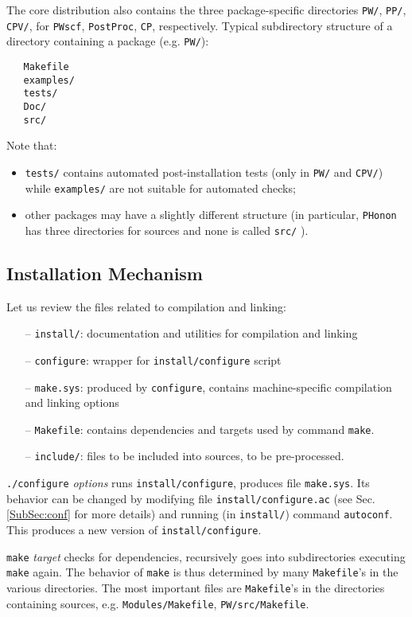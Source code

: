\documentclass[12pt,a4paper]{article}
\def\configure{\texttt{configure}}
\def\autoconf{\texttt{autoconf}}
\def\make.sys{\texttt{make.sys}}
\def\Makefile{\texttt{Makefile}}
\begin{document}
The core distribution also  contains the three package-specific directories
\texttt{PW/}, \texttt{PP/}, \texttt{CPV/}, for
 \texttt{PWscf}, \texttt{PostProc}, \texttt{CP}, respectively.
Typical subdirectory structure of a directory containing a package 
(e.g. \texttt{PW/}):
\begin{verbatim}
   Makefile
   examples/
   tests/
   Doc/
   src/
\end{verbatim}
Note that:
\begin{itemize}
\item \texttt{tests/} contains automated post-installation tests
(only in \texttt{PW/} and \texttt{CPV/}) while \texttt{examples/}
are not suitable for automated checks;
\item other packages may have a slightly different structure (in
particular, \texttt{PHonon} has three directories for sources
and none is called \texttt{src/} ).
\end{itemize}

\subsection{Installation Mechanism}

\label{SubSec:Inst}
Let us review the files related to compilation and linking:
\begin{itemize}
\item[--] \texttt{install/}: documentation and utilities for compilation 
and linking 
\item[--] \configure: wrapper for \texttt{install/configure} script
\item[--] \make.sys: produced by \texttt{configure}, contains 
machine-specific compilation and linking options
\item[--] \Makefile: contains dependencies and targets used by 
command \texttt{make}. 
\item[--] \texttt{include/}: files to be included into sources, to be 
pre-processed.
\end{itemize}
\texttt{./configure} {\em options} runs \texttt{install/configure},
produces file \make.sys. Its behavior can be changed by
modifying file \texttt{install/configure.ac} (see Sec.\ref{SubSec:conf}
for more details) and running (in \texttt{install/}) command \autoconf. 
This produces a new version of \texttt{install/configure}. 

\texttt{make} {\em target} checks for dependencies, recursively goes 
into subdirectories executing \texttt{make} again. The behavior of 
\texttt{make} is thus
determined by many \Makefile's in the various directories. The
most important files are \Makefile's in the directories containing
sources, e.g. \texttt{Modules/Makefile}, \texttt{PW/src/Makefile}.
\end{document}

